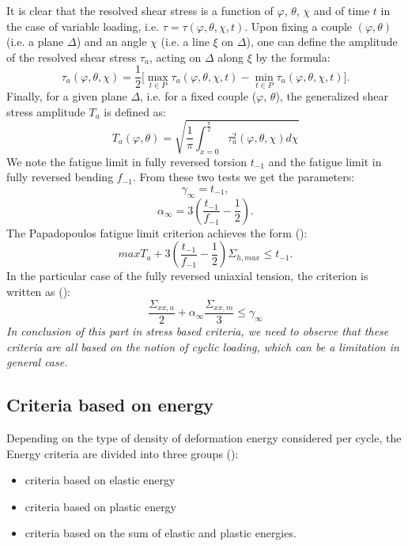 It is clear that the resolved shear stress is a function of
$\varphi$, $\theta$, $\chi$ and of time $t$ in the case of variable loading, i.e. $\tau=\tau(\varphi, \theta, \chi, t)$. Upon fixing a couple $(\varphi, \theta)$ (i.e. a plane
$\Delta$) and an angle $\chi$ (i.e. a line $\xi$ on $\Delta$), one can define the amplitude of the resolved shear stress $\tau_a$, acting on $\Delta$
along $\xi$ by the formula:
\begin{equation}
\tau_a(\varphi,\theta,\chi)=\frac{1}{2}\big[\max \limits_{t\in P}\tau_a(\varphi,\theta,\chi ,t)-\min \limits_{t\in P}\tau_a(\varphi,\theta,\chi ,t)\big].
\end{equation}
Finally, for a given plane $\Delta$, i.e. for a fixed couple ($\varphi$, $\theta$),
the generalized shear stress amplitude $T_a$ is defined as:
\begin{equation}
T_a(\varphi,\theta)=\sqrt{\frac{1}{\pi}\int_{x=0}^{\frac{\pi}{2}} \tau_a^2(\varphi,\theta,\chi)d\chi}
\label{Ta}
\end{equation}
We note the fatigue limit in fully reversed torsion $t_{-1}$ and the fatigue limit in fully reversed bending $f_{-1}$. From these two tests we get the parameters:
$$\gamma_\infty=t_{-1},$$ 
$$\alpha_\infty=3\left( \frac{t_{-1}}{f_{-1}}-\frac{1}{2}\right) .$$
The Papadopoulos fatigue limit criterion achieves the form (\cite{papadopoulos2001long}):
\begin{equation}
maxT_a+3\left( \frac{t_{-1}}{f_{-1}}-\frac{1}{2}\right) \Sigma_{h,max}\leqslant t_{-1}.
\label{eq:papadopoulos}
\end{equation}
In the particular case of the fully reversed uniaxial tension, the criterion is written as (\cite{papadopoulos2001long}):
$$\dfrac{\Sigma_{xx,a}}{2}+\alpha_\infty\dfrac{\Sigma_{xx,m}}{3} \leqslant\gamma_\infty$$
\textit{In conclusion of this part in stress based criteria, we need to observe that these criteria are all based on the notion of cyclic loading, which can be a limitation in general case.}
\subsection{Criteria based on energy}
Depending on the type of density of deformation energy considered per cycle, the
Energy criteria are divided into three groups (\cite{macha1999energy}):
\begin{itemize}
	\item  criteria based on elastic energy
	\item  criteria based on plastic energy
	\item  criteria based on the sum of elastic and plastic energies.
\end{itemize}

